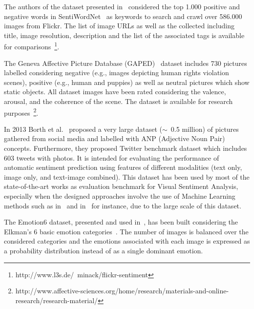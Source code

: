 The authors of the dataset presented in~\cite{siersdorfer2010analyzing} considered the top 1.000 positive and negative words in SentiWordNet~\cite{esuli2006sentiwordnet} as keywords to search and crawl over 586.000 images from Flickr. The list of image URLs as well as the collected including title, image resolution, description and the list of the associated tags is available for comparisons~\footnote{http://www.l3s.de/~minack/flickr-sentiment}.

The Geneva Affective Picture Database (GAPED)~\cite{dan2011geneva} dataset includes 730 pictures labelled considering negative (e.g., images depicting human rights violation scenes), positive (e.g., human and puppies) as well as neutral pictures which show static objects.
All dataset images have been rated considering the valence, arousal, and the coherence of the scene.
The dataset is available for research purposes~\footnote{http://www.affective-sciences.org/home/research/materials-and-online-research/research-material/}.

In 2013 Borth et al.~\cite{borth2013large} proposed a very large dataset ($\sim$~0.5 million) of pictures gathered from social media and labelled with ANP (Adjective Noun Pair) concepts. Furthermore, they proposed Twitter benchmark dataset which includes 603 tweets with photos. It is intended for evaluating the performance of automatic sentiment prediction using features of different modalities (text only, image only, and text-image combined). This dataset has been used by most of the state-of-the-art works as evaluation benchmark for Visual Sentiment Analysis, especially when the designed approaches involve the use of Machine Learning methods such as in~\cite{you2015robust} and in~\cite{yuan2013sentribute} for instance, due to the large scale of this dataset.

The Emotion6 dataset, presented and used in~\cite{peng2015mixed}, has been built considering the Elkman's 6 basic emotion categories~\cite{ekman1987universals}. The number of images is balanced over the considered categories and the emotions associated with each image is expressed as a probability distribution instead of as a single dominant emotion.

